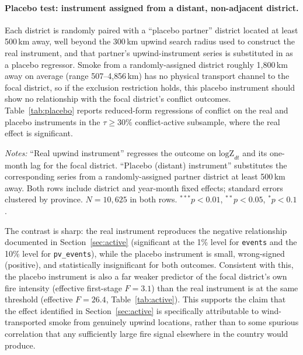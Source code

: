 \documentclass[12pt]{article}
\begin{document}
\paragraph{Placebo test: instrument assigned from a distant, non-adjacent district.} Each district is randomly paired with a ``placebo partner'' district located at least 500\,km away, well beyond the 300\,km upwind search radius used to construct the real instrument, and that partner's upwind-instrument series is substituted in as a placebo regressor. Smoke from a randomly-assigned district roughly 1{,}800\,km away on average (range 507--4{,}856\,km) has no physical transport channel to the focal district, so if the exclusion restriction holds, this placebo instrument should show no relationship with the focal district's conflict outcomes. Table~\ref{tab:placebo} reports reduced-form regressions of conflict on the real and placebo instruments in the $\tau \geq 30\%$ conflict-active subsample, where the real effect is significant.

\begin{table}[H]
\centering
\caption{Placebo test: real vs.\ distant-district instrument, $\tau \geq 30\%$ conflict-active sample}
\label{tab:placebo}
\begin{minipage}{0.95\textwidth}
\vspace{4pt}
\footnotesize \emph{Notes:} ``Real upwind instrument'' regresses the outcome on $\text{logZ}_{dt}$ and its one-month lag for the focal district. ``Placebo (distant) instrument'' substitutes the corresponding series from a randomly-assigned partner district at least 500\,km away. Both rows include district and year-month fixed effects; standard errors clustered by province. $N=10{,}625$ in both rows. $^{***}p<0.01$, $^{**}p<0.05$, $^{*}p<0.1$.
\end{minipage}
\end{table}

The contrast is sharp: the real instrument reproduces the negative relationship documented in Section~\ref{sec:active} (significant at the 1\% level for \texttt{events} and the 10\% level for \texttt{pv\_events}), while the placebo instrument is small, wrong-signed (positive), and statistically insignificant for both outcomes. Consistent with this, the placebo instrument is also a far weaker predictor of the focal district's own fire intensity (effective first-stage $F = 3.1$) than the real instrument is at the same threshold (effective $F = 26.4$, Table~\ref{tab:active}). This supports the claim that the effect identified in Section~\ref{sec:active} is specifically attributable to wind-transported smoke from genuinely upwind locations, rather than to some spurious correlation that any sufficiently large fire signal elsewhere in the country would produce.
\end{document}
